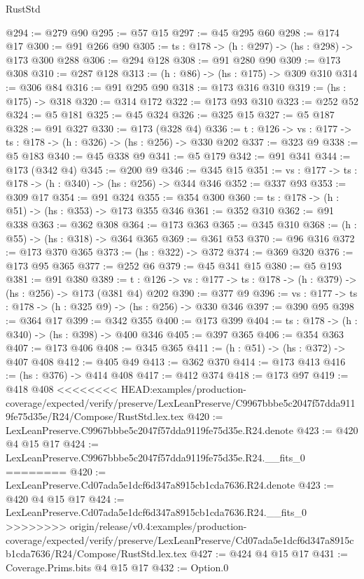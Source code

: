 \begin{lexlean}{RustStd}
\begin{coremodule}
{\begin{coremodule}
@294 := @279 @90
@295 := @57 @15
@297 := @45 @295 @60
@298 := @174 @17
@300 := @91 @266 @90
@305 := {ts : @178} -> (h : @297) -> (hs : @298) -> @173 @300 @288
@306 := @294 @128
@308 := @91 @280 @90
@309 := @173 @308
@310 := @287 @128
@313 := (h : @86) -> (hs : @175) -> @309 @310
@314 := @306 @84
@316 := @91 @295 @90
@318 := @173 @316 @310
@319 := (hs : @175) -> @318
@320 := @314 @172
@322 := @173 @93 @310
@323 := @252 @52
@324 := @5 @181
@325 := @45 @324
@326 := @325 @15
@327 := @5 @187
@328 := @91 @327
@330 := @173 (@328 @4)
@336 := {t : @126} -> {vs : @177} -> {ts : @178} -> (h : @326) -> (hs : @256) -> @330 @202
@337 := @323 @9
@338 := @5 @183
@340 := @45 @338 @9
@341 := @5 @179
@342 := @91 @341
@344 := @173 (@342 @4)
@345 := @200 @9
@346 := @345 @15
@351 := {vs : @177} -> {ts : @178} -> (h : @340) -> (hs : @256) -> @344 @346
@352 := @337 @93
@353 := @309 @17
@354 := @91 @324
@355 := @354 @300
@360 := {ts : @178} -> (h : @51) -> (hs : @353) -> @173 @355 @346
@361 := @352 @310
@362 := @91 @338
@363 := @362 @308
@364 := @173 @363
@365 := @345 @310
@368 := (h : @55) -> (hs : @318) -> @364 @365
@369 := @361 @53
@370 := @96 @316
@372 := @173 @370 @365
@373 := (hs : @322) -> @372
@374 := @369 @320
@376 := @173 @95 @365
@377 := @252 @6
@379 := @45 @341 @15
@380 := @5 @193
@381 := @91 @380
@389 := {t : @126} -> {vs : @177} -> {ts : @178} -> (h : @379) -> (hs : @256) -> @173 (@381 @4) @202
@390 := @377 @9
@396 := {vs : @177} -> {ts : @178} -> (h : @325 @9) -> (hs : @256) -> @330 @346
@397 := @390 @95
@398 := @364 @17
@399 := @342 @355
@400 := @173 @399
@404 := {ts : @178} -> (h : @340) -> (hs : @398) -> @400 @346
@405 := @397 @365
@406 := @354 @363
@407 := @173 @406
@408 := @345 @365
@411 := (h : @51) -> (hs : @372) -> @407 @408
@412 := @405 @49
@413 := @362 @370
@414 := @173 @413
@416 := (hs : @376) -> @414 @408
@417 := @412 @374
@418 := @173 @97
@419 := @418 @408
<<<<<<<< HEAD:examples/production-coverage/expected/verify/preserve/LexLeanPreserve/C9967bbbe5c2047f57dda9119fe75d35e/R24/Compose/RustStd.lex.tex
@420 := LexLeanPreserve.C9967bbbe5c2047f57dda9119fe75d35e.R24.denote
@423 := @420 @4 @15 @17
@424 := LexLeanPreserve.C9967bbbe5c2047f57dda9119fe75d35e.R24.__fits_0
========
@420 := LexLeanPreserve.Cd07ada5e1dcf6d347a8915cb1cda7636.R24.denote
@423 := @420 @4 @15 @17
@424 := LexLeanPreserve.Cd07ada5e1dcf6d347a8915cb1cda7636.R24.__fits_0
>>>>>>>> origin/release/v0.4:examples/production-coverage/expected/verify/preserve/LexLeanPreserve/Cd07ada5e1dcf6d347a8915cb1cda7636/R24/Compose/RustStd.lex.tex
@427 := @424 @4 @15 @17
@431 := Coverage.Prims.bits @4 @15 @17
@432 := Option.{0}

\end{coremodule}}
\end{coremodule}
\end{lexlean}
